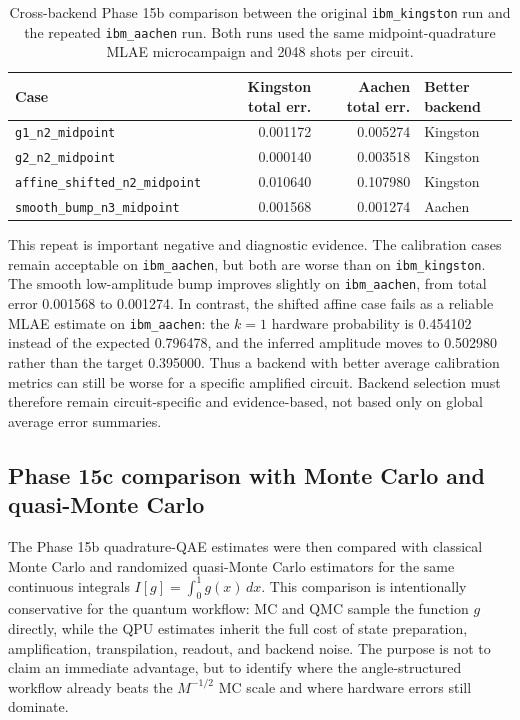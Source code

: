 \begin{table}[h]
\centering
\begin{tabular}{lrrl}
\toprule
Case & Kingston total err. & Aachen total err. & Better backend \\
\midrule
\texttt{g1\_n2\_midpoint} & 0.001172 & 0.005274 & Kingston \\
\texttt{g2\_n2\_midpoint} & 0.000140 & 0.003518 & Kingston \\
\texttt{affine\_shifted\_n2\_midpoint} & 0.010640 & 0.107980 & Kingston \\
\texttt{smooth\_bump\_n3\_midpoint} & 0.001568 & 0.001274 & Aachen \\
\bottomrule
\end{tabular}
\caption{Cross-backend Phase 15b comparison between the original
\texttt{ibm\_kingston} run and the repeated \texttt{ibm\_aachen} run. Both
runs used the same midpoint-quadrature MLAE microcampaign and 2048 shots per
circuit.}
\label{tab:phase15b-cross-backend}
\end{table}

This repeat is important negative and diagnostic evidence. The calibration
cases remain acceptable on \texttt{ibm\_aachen}, but both are worse than on
\texttt{ibm\_kingston}. The smooth low-amplitude bump improves slightly on
\texttt{ibm\_aachen}, from total error 0.001568 to 0.001274. In contrast, the
shifted affine case fails as a reliable MLAE estimate on \texttt{ibm\_aachen}:
the \(k=1\) hardware probability is 0.454102 instead of the expected 0.796478,
and the inferred amplitude moves to 0.502980 rather than the target 0.395000.
Thus a backend with better average calibration metrics can still be worse for a
specific amplified circuit. Backend selection must therefore remain
circuit-specific and evidence-based, not based only on global average error
summaries.

\subsection{Phase 15c comparison with Monte Carlo and quasi-Monte Carlo}
\label{subsec:phase15c-mcqmc}

The Phase 15b quadrature-QAE estimates were then compared with classical Monte
Carlo and randomized quasi-Monte Carlo estimators for the same continuous
integrals \(I[g]=\int_0^1 g(x)\,dx\). This comparison is intentionally
conservative for the quantum workflow: MC and QMC sample the function \(g\)
directly, while the QPU estimates inherit the full cost of state preparation,
amplification, transpilation, readout, and backend noise. The purpose is not to
claim an immediate advantage, but to identify where the angle-structured
workflow already beats the \(M^{-1/2}\) MC scale and where hardware errors still
dominate.

